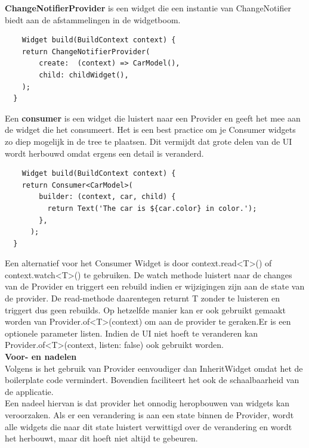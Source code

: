 \textbf{ChangeNotifierProvider} is een widget die een instantie van ChangeNotifier biedt aan de afstammelingen in de widgetboom.
\begin{verbatim}
    Widget build(BuildContext context) {
    return ChangeNotifierProvider(
        create:  (context) => CarModel(),
        child: childWidget(),
    );
  }
\end{verbatim}
Een \textbf{consumer} is een widget die luistert naar een Provider en geeft het mee aan de widget die het consumeert.
Het is een best practice om je Consumer widgets zo diep mogelijk in de tree te plaatsen. Dit vermijdt dat grote delen van de UI wordt herbouwd omdat ergens een detail is veranderd.

\begin{verbatim}
    Widget build(BuildContext context) {
    return Consumer<CarModel>(
        builder: (context, car, child) {
          return Text('The car is ${car.color} in color.');
        },
      );
  }
\end{verbatim}
Een alternatief voor het Consumer Widget is door context.read<T>() of context.watch<T>() te gebruiken. De watch methode luistert naar de changes van de Provider en triggert een rebuild indien er wijzigingen zijn aan de state van de provider. De read-methode daarentegen
returnt T zonder te luisteren en triggert dus geen rebuilds. Op hetzelfde manier kan er ook gebruikt gemaakt worden van Provider.of<T>(context) om aan de provider te geraken.Er is een optionele parameter listen. Indien de UI niet hoeft te veranderen kan Provider.of<T>(context, listen: false) ook gebruikt worden. 
\hfill
\\ 

\textbf{Voor- en nadelen}
\\
Volgens \textcite{Makadiya2022} is het gebruik van Provider eenvoudiger dan InheritWidget omdat het de boilerplate code vermindert. Bovendien faciliteert het ook de schaalbaarheid van de applicatie.
\\
Een nadeel hiervan is dat provider het onnodig heropbouwen van widgets kan veroorzaken. Als er een verandering is aan een state binnen de Provider, wordt alle widgets die naar dit state luistert 
verwittigd over de verandering en wordt het herbouwt, maar dit hoeft niet altijd te gebeuren.





